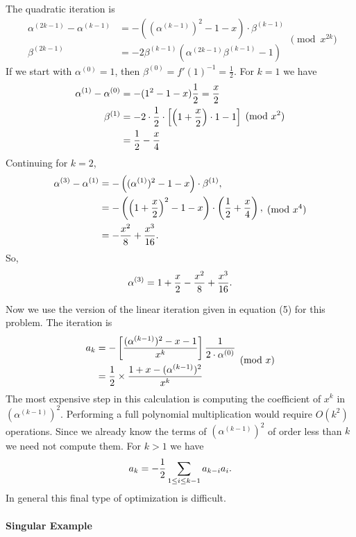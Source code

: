 {The quadratic iteration is
\[
\begin{aligned}
  \alpha^{(2k-1)} - \alpha^{(k-1)} &= - 
    ((\alpha^{(k-1)})^2 - 1 - x) \cdot \beta^{(k-1)}\\
  \beta^{(2k-1)} &= -2 \beta^{(k-1)} (\alpha^{(2k-1)} \beta^{(k-1)} -1)
\end{aligned}\pmod{x^{2k}}
\]
If we start with $\alpha^{(0)} = 1$, then $\beta^{(0)} = f'(1)^{-1} =
\frac{1}{2}$.  For $k = 1$ we have
\[
\begin{aligned}
  \alpha^{(1)} - \alpha^{(0)} & = - (1^2 - 1 -x) {1 \over 2} = \frac{x}{2}\\
    \beta^{(1)} &= - 2 \cdot {1 \over 2} \cdot \left[ \left(1 + {x \over 2}\right)
    \cdot 1 - 1\right]\\
   & = {1\over 2} - {x \over 4}
\end{aligned}
\pmod{x^{2}}
\]
Continuing for $k = 2$,
\[
\begin{aligned}
  \alpha^{(3)} - \alpha^{(1)} 
    & = - \left( (\alpha^{(1)})^2 - 1 - x\right) \cdot \beta^{(1)}, \\
    &= - \left(\left(1 + \frac{x}{2}\right)^2 - 1 - x\right)
    \cdot \left({1 \over 2} + {x \over 4}\right),\\
    & = - {x^2 \over 8} + {x^3 \over 16}.
\end{aligned}
\pmod{x^4}
\]
So,
\[
\alpha^{(3)} = 1 + {x \over 2} - {x^2 \over 8} + {x^3 \over 16}.
\]

Now we use the version of the linear iteration given in equation (5) for
this problem.  The iteration is
\[
\begin{aligned}
  a_k &= - \left[ {(\alpha^{(k-1)})^2 - x - 1 \over x^k}\right] {1 \over
      2 \cdot \alpha^{(0)}}\\
    &= {1 \over 2} \times { 1 + x - (\alpha^{(k-1)})^2 \over x^k}
\end{aligned}
\pmod{x}
\]
The most expensive step in this calculation is computing the coefficient of
$x^k$ in $(\alpha^{(k-1)})^2$.  Performing a full polynomial multiplication
would require $O(k^2)$ operations.  Since we already know the terms of
$(\alpha^{(k-1)})^2$ of order less than $k$ we need not compute them.  For $k >
1$ we have
\[
a_k = - {1 \over 2} \sum_{1 \le i \le k-1} a_{k-i} a_i.
\]
In general this final type of optimization is difficult.

\paragraph{Singular Example}

}
